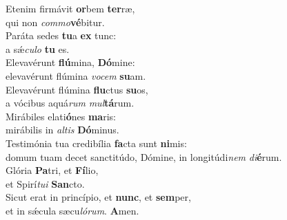 \evenverse Etenim firmávit \textbf{or}bem \textbf{ter}ræ,~\*\\
\evenverse qui non \textit{com}\textit{mo}\textbf{vé}bitur.\\
\oddverse Paráta sedes \textbf{tu}a \textbf{ex} tunc:~\*\\
\oddverse a sǽ\textit{cu}\textit{lo} \textbf{tu} es.\\
\evenverse Elevavérunt \textbf{flú}mina, \textbf{Dó}mine:~\*\\
\evenverse elevavérunt flúmina \textit{vo}\textit{cem} \textbf{su}am.\\
\oddverse Elevavérunt flúmina \textbf{flu}ctus \textbf{su}os,~\*\\
\oddverse a vócibus aquá\textit{rum} \textit{mul}\textbf{tá}rum.\\
\evenverse Mirábiles elati\textbf{ó}nes \textbf{ma}ris:~\*\\
\evenverse mirábilis in \textit{al}\textit{tis} \textbf{Dó}minus.\\
\oddverse Testimónia tua credibília \textbf{fa}cta sunt \textbf{ni}mis:~\*\\
\oddverse domum tuam decet sanctitúdo, Dómine, in longitúdi\textit{nem} \textit{di}\textbf{é}rum.\\
\evenverse Glória \textbf{Pa}tri, et \textbf{Fí}lio,~\*\\
\evenverse et Spirí\textit{tu}\textit{i} \textbf{San}cto.\\
\oddverse Sicut erat in princípio, et \textbf{nunc}, et \textbf{sem}per,~\*\\
\oddverse et in sǽcula sæcu\textit{ló}\textit{rum}. \textbf{A}men.\\
